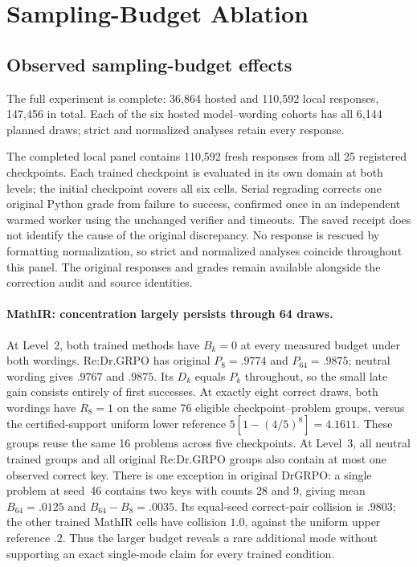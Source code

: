 \documentclass{article}
\newcommand{\1}{\mathbf 1}
\theoremstyle{remark}
\theoremstyle{definition}
\theoremstyle{plain}
\begin{document}
\clearpage
\section{Sampling-Budget Ablation}
\label{app:sampling-budget-ablation}







\subsection{Observed sampling-budget effects}

The full experiment is complete: 36,864 hosted and 110,592 local responses,
147,456 in total. Each of the six hosted model--wording cohorts has all
6,144 planned draws; strict and normalized analyses retain every response.

The completed local panel contains 110,592 fresh responses from all 25
registered checkpoints. Each trained checkpoint is evaluated in its own domain
at both levels; the initial checkpoint covers all six cells. Serial regrading
corrects one original Python grade from failure to success, confirmed once
in an independent warmed worker using the unchanged verifier and timeouts.
The saved receipt does not identify the cause of the original discrepancy.
No response is rescued by formatting normalization, so strict and normalized
analyses coincide throughout this panel. The original responses and grades
remain available alongside the correction audit and source identities.

\paragraph{MathIR: concentration largely persists through 64 draws.}
At Level~2, both trained methods have $B_k=0$ at every measured budget under
both wordings. Re:Dr.GRPO has original $P_8=.9774$ and $P_{64}=.9875$;
neutral wording gives $.9767$ and $.9875$. Its $D_k$ equals $P_k$ throughout,
so the small late gain consists entirely of first successes. At exactly eight
correct draws, both wordings have $R_8=1$ on the same 76 eligible
checkpoint--problem groups, versus the certified-support uniform lower
reference $5[1-(4/5)^8]=4.1611$. These groups reuse the same 16 problems
across five checkpoints. At Level~3, all neutral trained groups and all
original Re:Dr.GRPO groups also contain at most one observed correct key.
There is one exception in original DrGRPO: a single problem at seed~46
contains two keys with counts 28 and 9, giving mean $B_{64}=.0125$ and
$B_{64}-B_8=.0035$. Its equal-seed correct-pair collision is $.9803$;
the other trained MathIR cells have collision $1.0$, against the uniform
upper reference $.2$. Thus the larger budget reveals a rare additional mode
without supporting an exact single-mode claim for every trained condition.
\end{document}
